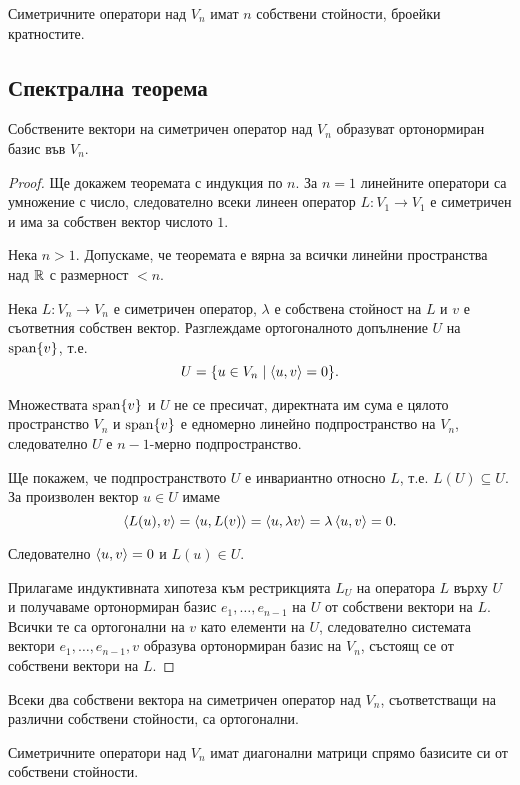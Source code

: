 \documentclass[numbers=endperiod, DIV=15, bibliography=totocnumbered]{scrartcl}
\begin{document}
\begin{corollary}
  Симетричните оператори над $V_n$ имат $n$ собствени стойности, броейки кратностите.
\end{corollary}

\subsection{Спектрална теорема}

\begin{theorem}
  Собствените вектори на симетричен оператор над $V_n$ образуват ортонормиран базис във $V_n$.
\end{theorem}
\begin{proof}
  Ще докажем теоремата с индукция по $n$. За $n = 1$ линейните оператори са умножение с число, следователно всеки линеен оператор $L: V_1 \to V_1$ е симетричен и има за собствен вектор числото $1$.

  Нека $n > 1$. Допускаме, че теоремата е вярна за всички линейни пространства над $\mathbb{R}$ с размерност $< n$.

  Нека $L: V_n \to V_n$ е симетричен оператор, $\lambda$ е собствена стойност на $L$ и $v$ е съответния собствен вектор. Разглеждаме ортогоналното допълнение $U$ на $\operatorname{span} \{ v \}$, т.е.
  \begin{displaymath}
    U = \{ u \in V_n \mid \left\langle u, v \right\rangle = 0 \}.
  \end{displaymath}

  Множествата $\operatorname{span} \{ v \}$ и $U$ не се пресичат, директната им сума е цялото пространство $V_n$ и $\operatorname{span} \{ v \}$ е едномерно линейно подпространство на $V_n$, следователно $U$ е $n-1$-мерно подпространство.

  Ще покажем, че подпространството $U$ е инвариантно относно $L$, т.е. $L(U) \subseteq U$. За произволен вектор $u \in U$ имаме
  \begin{displaymath}
    \left\langle L(u), v \right\rangle
    =
    \left\langle u, L(v) \right\rangle
    =
    \left\langle u, \lambda v \right\rangle
    =
    \lambda \left\langle u, v \right\rangle
    =
    0.
  \end{displaymath}

  Следователно $\left\langle u, v \right\rangle = 0$ и $L(u) \in U$.

  Прилагаме индуктивната хипотеза към рестрикцията $L_U$ на оператора $L$ върху $U$ и получаваме ортонормиран базис $e_1, \ldots, e_{n-1}$ на $U$ от собствени вектори на $L$. Всички те са ортогонални на $v$ като елементи на $U$, следователно системата вектори $e_1, \ldots, e_{n-1}, v$ образува ортонормиран базис на $V_n$, състоящ се от собствени вектори на $L$.
\end{proof}

\begin{corollary}
  Всеки два собствени вектора на симетричен оператор над $V_n$, съответстващи на различни собствени стойности, са ортогонални.
\end{corollary}

\begin{corollary}
  Симетричните оператори над $V_n$ имат диагонални матрици спрямо базисите си от собствени стойности.
\end{corollary}

\printbibliography
\end{document}
